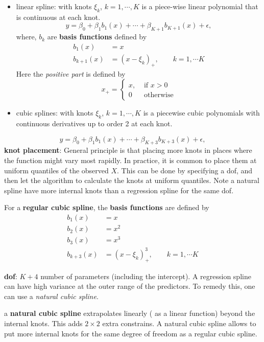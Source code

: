 \documentclass[
  letterpaper,
  DIV=11,
  numbers=noendperiod]{scrreprt}
\begin{document}
\begin{itemize}
\item
  linear spline: with knots \(\xi_k\), \(k=1, \cdots, K\) is a
  piece-wise linear polynomial that is continuous at each knot. \[
  y= \beta_0+\beta_1 b_1(x)+\cdots + \beta_{K+1}b_{K+1}(x)+\epsilon, 
  \] where, \(b_k\) are \textbf{basis functions} defined by
  \begin{align}
  b_1(x) & = x \\
  b_{k+1}(x) & = (x- \xi_k)_{+}, \qquad k=1, \cdots K
  \end{align} Here the \emph{positive part} is defined by
  \[x_{+}=\begin{cases}
  x, &  \text{ if } x>0 \\
  0 &  \text{ otherwise}
  \end{cases}
  \]
\item
  cubic splines: with knots \(\xi_k\), \(k=1, \cdots, K\) is a piecewise
  cubic polynomials with continuous derivatives up to order 2 at each
  knot.
\end{itemize}

\[
y= \beta_0+\beta_1 b_1(x)+\cdots + \beta_{K+3}b_{K+3}(x)+\epsilon, 
\] \textbf{knot placement}: General principle is that placing more knots
in places where the function might vary most rapidly. In practice, it is
common to place them at uniform quantiles of the observed \(X\). This
can be done by specifying a dof, and then let the algorithm to calculate
the knots at uniform quantiles. Note a natural spline have more internal
knots than a regression spline for the same dof.

For a \textbf{regular cubic spline}, the \textbf{basis functions} are
defined by \begin{align}
b_1(x) & = x \\
b_2(x) & = x^2 \\
b_3(x) & = x^3 \\
b_{k+3}(x) & = (x- \xi_k)^3_{+}, \qquad k=1, \cdots K
\end{align}

\textbf{dof}: \(K+4\) number of parameters (including the intercept). A
regression spline can have high variance at the outer range of the
predictors. To remedy this, one can use a \emph{natural cubic spline}.

a \textbf{natural cubic spline} extrapolates linearly ( as a linear
function) beyond the internal knots. This adds \(2\times 2\) extra
constrains. A natural cubic spline allows to put more internal knots for
the same degree of freedom as a regular cubic spline.
\end{document}
